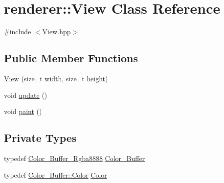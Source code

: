 \hypertarget{classrenderer_1_1_view}{}\section{renderer\+::View Class Reference}
\label{classrenderer_1_1_view}


{\ttfamily \#include $<$View.\+hpp$>$}

\subsection*{Public Member Functions}
\begin{DoxyCompactItemize}
\item 
\mbox{\hyperlink{classrenderer_1_1_view_adc738c9a34cb291758e9a163c06b7024}{View}} (size\+\_\+t \mbox{\hyperlink{classrenderer_1_1_view_a5632e677221be9cb1120c432acb40893}{width}}, size\+\_\+t \mbox{\hyperlink{classrenderer_1_1_view_a7fa20c6d863431bb46aed44686231b4b}{height}})
\item 
void \mbox{\hyperlink{classrenderer_1_1_view_ac38d65d08ad6ee7348f85a2bf7b03991}{update}} ()
\item 
void \mbox{\hyperlink{classrenderer_1_1_view_aea944e5b2ae8e4b6c403e4e0446ad021}{paint}} ()
\end{DoxyCompactItemize}
\subsection*{Private Types}
\begin{DoxyCompactItemize}
\item 
typedef \mbox{\hyperlink{classrenderer_1_1_color___buffer___rgba8888}{Color\+\_\+\+Buffer\+\_\+\+Rgba8888}} \mbox{\hyperlink{classrenderer_1_1_view_a21ded0a0afb4aea559b74d004cee798f}{Color\+\_\+\+Buffer}}
\item 
typedef \mbox{\hyperlink{structrenderer_1_1_color___buffer___rgba8888_1_1_color}{Color\+\_\+\+Buffer\+::\+Color}} \mbox{\hyperlink{classrenderer_1_1_view_a428e8cb10cb82eb1abf59719eb5ba830}{Color}}
\end{DoxyCompactItemize}
